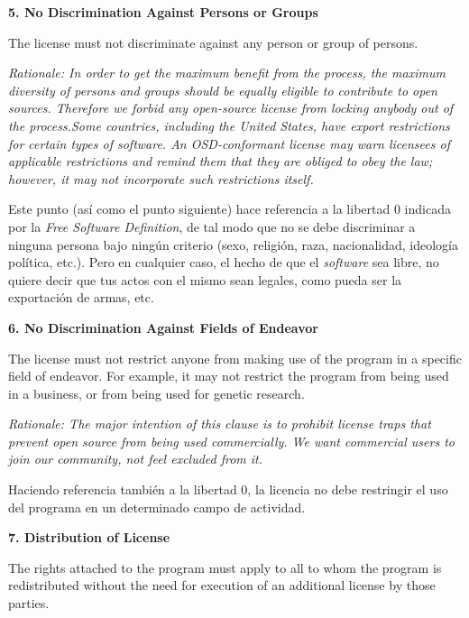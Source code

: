 {\bf 5. No Discrimination Against Persons or Groups

The license must not discriminate against any person or group of persons.}

\textit{Rationale: In order to get the maximum benefit from the process, the
maximum diversity of persons and groups should be equally eligible to contribute
to open sources. Therefore we forbid any open-source license from locking
anybody out of the process.\newline Some countries, including the United States,
have export restrictions for certain types of software. An OSD-conformant
license may warn licensees of applicable restrictions and remind them that they
are obliged to obey the law; however, it may not incorporate such restrictions
itself.}\vspace{0.4cm}

Este punto (así como el punto siguiente) hace referencia a la libertad 0
indicada por la \textit{Free Software Definition}, de tal modo que no se debe
discriminar a ninguna persona bajo ningún criterio (sexo, religión, raza,
nacionalidad, ideología política, etc.). Pero en cualquier caso, el hecho de que
el \textit{software} sea libre, no quiere decir que tus actos con el mismo sean
legales, como pueda ser la exportación de armas, etc.\vspace{0.4cm}

{\bf 6. No Discrimination Against Fields of Endeavor

The license must not restrict anyone from making use of the program in a
specific field of endeavor. For example, it may not restrict the program from
being used in a business, or from being used for genetic research.}

\textit{Rationale: The major intention of this clause is to prohibit license
traps that prevent open source from being used commercially. We want commercial
users to join our community, not feel excluded from it.}\vspace{0.4cm}

Haciendo referencia también a la libertad 0, la licencia no debe restringir el
uso del programa en un determinado campo de actividad.\vspace{0.4cm}

{\bf 7. Distribution of License

The rights attached to the program must apply to all to whom the program is
redistributed without the need for execution of an additional license by those
parties.}

